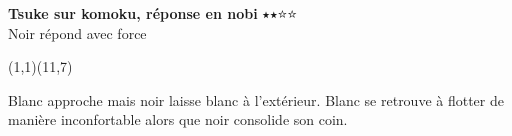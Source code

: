 \documentclass[preview, border=0pt, varwidth=false]{standalone}
\begin{document}
	\setgounit{0.6cm} 
	
\parbox[c][14.65cm][c]{10.2cm}{
	\centering
	
	{\Large\textbf{Tsuke sur komoku, réponse en nobi} 	$\medblackstar \medblackstar \medwhitestar \medwhitestar$ \\ Noir répond avec force}
	\vspace{3em}
	
	\begin{psgopartialboard}{(1,1)(11,7)}
		\pass
	\end{psgopartialboard}
	
	\vspace{1em}
	Blanc approche mais noir laisse blanc à l'extérieur. Blanc se retrouve à flotter de manière inconfortable alors que noir consolide son coin.}
\end{document}
